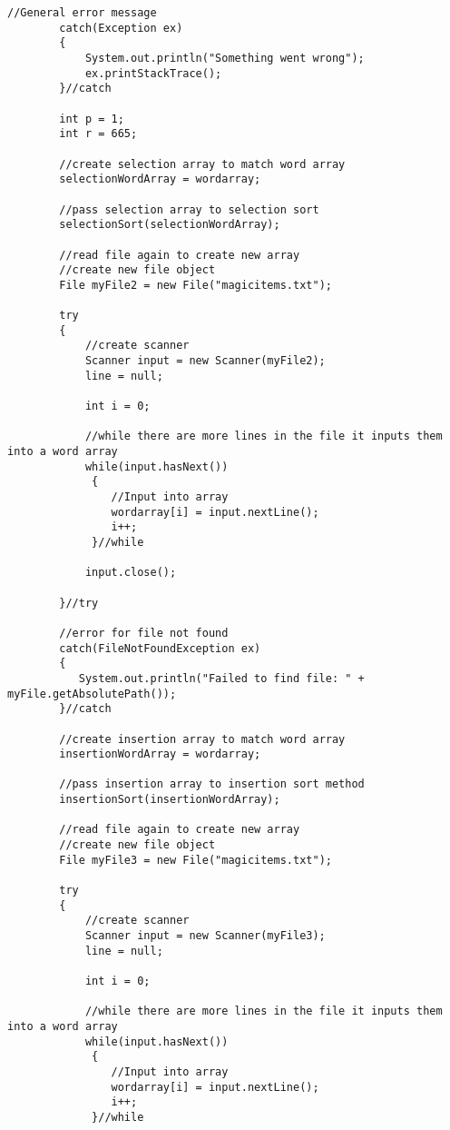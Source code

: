\documentclass[letterpaper, 10pt,DIV=13]{scrartcl}
\numberwithin{equation}{section} %
\numberwithin{figure}{section} %
\numberwithin{table}{section} %
\begin{document}
\begin{lstlisting}[frame=single, ]
        //General error message
        catch(Exception ex)
        {
            System.out.println("Something went wrong");
            ex.printStackTrace();
        }//catch

        int p = 1;
        int r = 665;

        //create selection array to match word array
        selectionWordArray = wordarray;

        //pass selection array to selection sort
        selectionSort(selectionWordArray);

        //read file again to create new array
        //create new file object
        File myFile2 = new File("magicitems.txt");
        
        try
        {
            //create scanner
            Scanner input = new Scanner(myFile2);
            line = null;
            
            int i = 0;

            //while there are more lines in the file it inputs them into a word array
            while(input.hasNext())
             {  
                //Input into array 
                wordarray[i] = input.nextLine();        
                i++;
             }//while

            input.close();  

        }//try

        //error for file not found
        catch(FileNotFoundException ex)
        {
           System.out.println("Failed to find file: " + myFile.getAbsolutePath()); 
        }//catch

        //create insertion array to match word array
        insertionWordArray = wordarray;

        //pass insertion array to insertion sort method
        insertionSort(insertionWordArray);

        //read file again to create new array
        //create new file object
        File myFile3 = new File("magicitems.txt");
        
        try
        {
            //create scanner
            Scanner input = new Scanner(myFile3);
            line = null;
            
            int i = 0;

            //while there are more lines in the file it inputs them into a word array
            while(input.hasNext())
             {  
                //Input into array 
                wordarray[i] = input.nextLine();        
                i++;
             }//while


\end{lstlisting}
\end{document}
